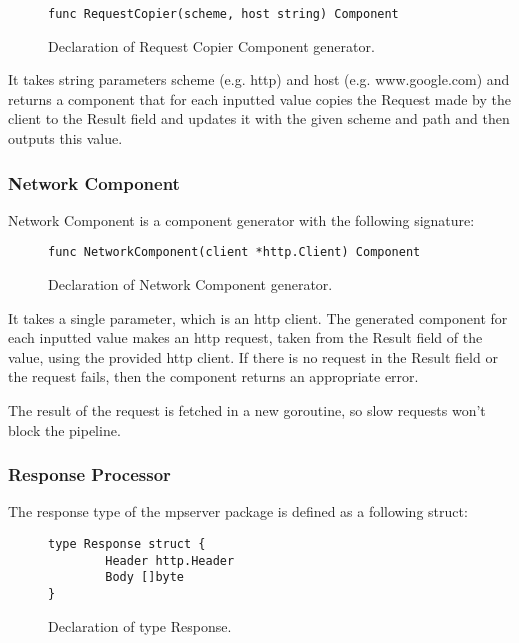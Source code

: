 \documentclass[12pt,a4paper]{article}
\begin{document}
\begin{figure}[h]
\centering
\begin{lstlisting}
func RequestCopier(scheme, host string) Component
\end{lstlisting}
\caption[scale=1.0]{Declaration of Request Copier Component generator.}
\label{fig:RequestCopier}
\end{figure}

It takes string parameters scheme (e.g. http) and host (e.g. www.google.com) 
and returns a component that for each inputted value copies the Request made 
by the client to the Result field and updates it with the given scheme and 
path and then outputs this value.

\subsubsection{Network Component}
Network Component is a component generator with the following signature:

\begin{figure}[h]
\centering
\begin{lstlisting}
func NetworkComponent(client *http.Client) Component
\end{lstlisting}
\caption[scale=1.0]{Declaration of Network Component generator.}
\label{fig:NetworkComponent}
\end{figure}

It takes a single parameter, which is an http client.
The generated component for each inputted value makes an http request,
taken from the Result field of the value, using the provided http client.
If there is no request in the Result field or the request fails, then
the component returns an appropriate error. 

The result of the request is fetched in a new goroutine, so slow requests
won't block the pipeline.

\subsubsection{Response Processor}
The response type of the mpserver package is defined as a following struct:

\begin{figure}[h]
\centering
\begin{lstlisting}
type Response struct {
		Header http.Header
		Body []byte
}
\end{lstlisting}
\caption[scale=1.0]{Declaration of type Response.}
\label{fig:Response}
\end{figure}
\end{document}

